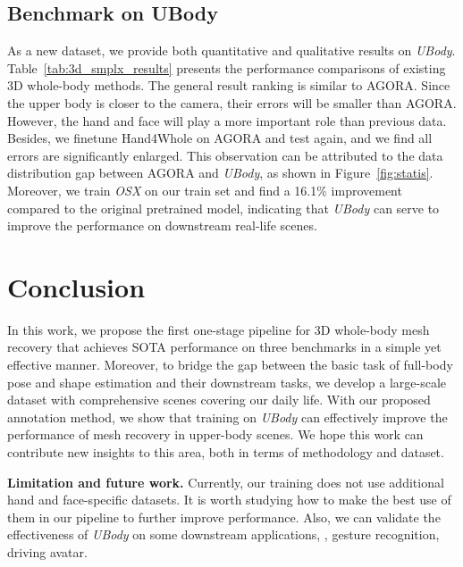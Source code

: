 \documentclass[10pt,twocolumn,letterpaper]{article}
\newcommand{\modelname}{\emph{OSX}\xspace}
\newcommand{\dataname}{\emph{UBody}\xspace}
\begin{document}
\vspace{-0.2cm}
\subsection{Benchmark on UBody}
\vspace{-0.2cm}
As a new dataset, we provide both quantitative and qualitative results on \dataname. Table~\ref{tab:3d_smplx_results} presents the performance comparisons of existing 3D whole-body methods. The general result ranking is similar to AGORA. Since the upper body is closer to the camera, their errors will be smaller than AGORA. However, the hand and face will play a more important role than previous data. 
Besides, we finetune Hand4Whole on AGORA and test again, and we find all errors are significantly enlarged. This observation can be attributed to the data distribution gap between AGORA and \dataname, as shown in Figure~\ref{fig:statis}. Moreover, we train \modelname on our train set and find a 16.1\% improvement compared to the original pretrained model, indicating that \dataname can serve to improve the performance on downstream real-life scenes.


 \vspace{-0.1cm}
\section{Conclusion}
\vspace{-0.1cm}
In this work, we propose the first one-stage pipeline for 3D whole-body mesh recovery that achieves SOTA performance on three benchmarks in a simple yet effective manner. Moreover, to bridge the gap between the basic task of full-body pose and shape estimation and their downstream tasks, we develop a large-scale dataset with comprehensive scenes covering our daily life. With our proposed annotation method, we show that training on \emph{UBody} can effectively improve the performance of mesh recovery in upper-body scenes. We hope this work can contribute new insights to this area, both in terms of methodology and dataset.

\noindent \textbf{Limitation and future work.}
Currently, our training does not use additional hand and face-specific datasets. It is worth studying how to make the best use of them in our pipeline to further improve performance. Also, we can validate the effectiveness of \emph{UBody} on some downstream applications, \eg, gesture recognition, driving avatar.
\end{document}
